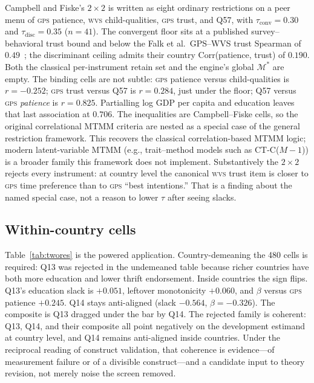 \documentclass[10pt,letterpaper]{article}
\newcommand{\GPS}{\textsc{gps}}
\newcommand{\WVS}{\textsc{wvs}}
\newcommand{\M}{\ensuremath{\mathcal{M}}}
\begin{document}
Campbell and Fiske's $2\times 2$ is written as eight ordinary restrictions on a peer menu of \GPS{} patience, \WVS{} child-qualities, \GPS{} trust, and Q57, with $\tau_{\mathrm{conv}}=0.30$ and $\tau_{\mathrm{disc}}=0.35$ ($n=41$).
The convergent floor sits at a published survey--behavioral trust bound and below the Falk et al.\ GPS--WVS trust Spearman of $0.49$~\cite{falk2018}; the discriminant ceiling admits their country Corr(patience, trust) of $0.190$.
Both the classical per-instrument retain set and the engine's global $\M^*$ are empty.
The binding cells are not subtle: \GPS{} patience versus child-qualities is $r=-0.252$; \GPS{} trust versus Q57 is $r=0.284$, just under the floor; Q57 versus \GPS{} \emph{patience} is $r=0.825$.
Partialling log GDP per capita and education leaves that last association at $0.706$.
The inequalities are Campbell--Fiske cells, so the original correlational MTMM criteria are nested as a special case of the general restriction framework.
This recovers the classical correlation-based MTMM logic; modern latent-variable MTMM (e.g., trait--method models such as CT-C($M-1$)) is a broader family this framework does not implement.
Substantively the $2\times 2$ rejects every instrument: at country level the canonical \WVS{} trust item is closer to \GPS{} time preference than to \GPS{} ``best intentions.''
That is a finding about the named special case, not a reason to lower $\tau$ after seeing slacks.

\subsection{Within-country cells}
\label{sec:app-cells}

Table~\ref{tab:twores} is the powered application.
Country-demeaning the 480 cells is required: Q13 was rejected in the undemeaned table because richer countries have both more education and lower thrift endorsement.
Inside countries the sign flips.
Q13's education slack is $+0.051$, leftover monotonicity $+0.060$, and $\beta$ versus \GPS{} patience $+0.245$.
Q14 stays anti-aligned (slack $-0.564$, $\beta=-0.326$).
The composite is Q13 dragged under the bar by Q14.
The rejected family is coherent: Q13, Q14, and their composite all point negatively on the development estimand at country level, and Q14 remains anti-aligned inside countries.
Under the reciprocal reading of construct validation, that coherence is evidence---of measurement failure or of a divisible construct---and a candidate input to theory revision, not merely noise the screen removed.
\end{document}

